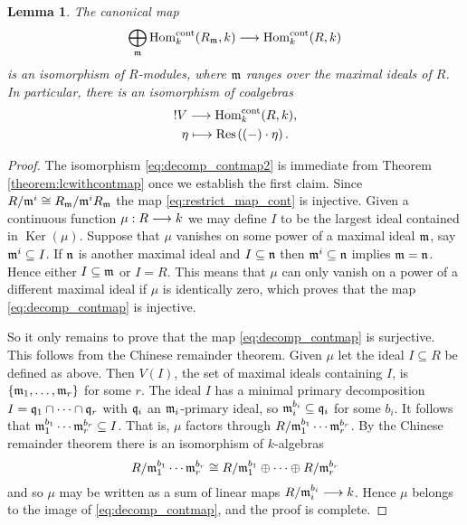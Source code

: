 \documentclass[english,letter paper,12pt,reqno]{article}
\newtheorem{lemma}[theorem]{Lemma}
\theoremstyle{example}
\numberwithin{equation}{section}
\def\Ker{\operatorname{Ker}}
\def\Hom{\operatorname{Hom}}
\begin{document}
\begin{lemma}\label{lemma:decomp_contmap} The canonical map
\begin{equation}\label{eq:decomp_contmap}
\bigoplus_{\mf{m}} \Hom_k^{\cont}(R_{\mf{m}},k) \lto \Hom_k^{\cont}(R,k)
\end{equation}
is an isomorphism of $R$-modules, where $\mathfrak{m}$ ranges over the maximal ideals of $R$. In particular, there is an isomorphism of coalgebras
\begin{gather}
{!} V \lto \Hom_k^{\cont}(R,k), \label{eq:decomp_contmap2}\\
\eta \longmapsto \Res\;( (-) \cdot \eta )\,.\nonumber
\end{gather}
\end{lemma}
\begin{proof}
The isomorphism \eqref{eq:decomp_contmap2} is immediate from Theorem \ref{theorem:lcwithcontmap} once we establish the first claim. Since $R/\mathfrak{m}^i \cong R_{\mathfrak{m}}/\mathfrak{m}^iR_{\mathfrak{m}}$ the map \eqref{eq:restrict_map_cont} is injective. Given a continuous function $\mu: R \longrightarrow k$ we may define $I$ to be the largest ideal contained in $\Ker(\mu)$. Suppose that $\mu$ vanishes on some power of a maximal ideal $\mathfrak{m}$, say $\mathfrak{m}^i \subseteq I$. If $\mathfrak{n}$ is another maximal ideal and $I \subseteq \mathfrak{n}$ then $\mathfrak{m}^i \subseteq \mathfrak{n}$ implies $\mathfrak{m} = \mathfrak{n}$. Hence either $I \subseteq \mathfrak{m}$ or $I = R$. This means that $\mu$ can only vanish on a power of a different maximal ideal if $\mu$ is identically zero, which proves that the map \eqref{eq:decomp_contmap} is injective.

So it only remains to prove that the map \eqref{eq:decomp_contmap} is surjective. This follows from the Chinese remainder theorem. Given $\mu$ let the ideal $I \subseteq R$ be defined as above. Then $V(I)$, the set of maximal ideals containing $I$, is $\{ \mathfrak{m}_1,\ldots,\mathfrak{m}_r \}$ for some $r$. The ideal $I$ has a minimal primary decomposition $I = \mathfrak{q}_1 \cap \cdots \cap \mathfrak{q}_r$ with $\mathfrak{q}_i$ an $\mathfrak{m}_i$-primary ideal, so $\mathfrak{m}_i^{b_i} \subseteq \mathfrak{q}_i$ for some $b_i$. It follows that $\mathfrak{m}_1^{b_1} \cdots \mathfrak{m}_r^{b_r} \subseteq I$. That is, $\mu$ factors through $R/\mathfrak{m}_1^{b_1} \cdots \mathfrak{m}_r^{b_r}$. By the Chinese remainder theorem there is an isomorphism of $k$-algebras
\[
R/\mathfrak{m}_1^{b_1} \cdots \mathfrak{m}_r^{b_r} \cong R/\mathfrak{m}_1^{b_1} \oplus \cdots \oplus R/\mathfrak{m}_r^{b_r}
\]
and so $\mu$ may be written as a sum of linear maps $R/\mathfrak{m}_i^{b_i} \longrightarrow k$. Hence $\mu$ belongs to the image of \eqref{eq:decomp_contmap}, and the proof is complete.
\end{proof}
\end{document}
